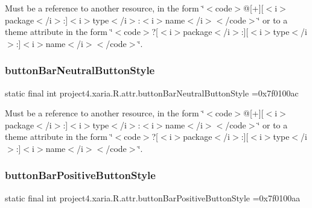 Must be a reference to another resource, in the form \char`\"{}$<$code$>$@\mbox{[}+\mbox{]}\mbox{[}$<$i$>$package$<$/i$>$\+:\mbox{]}$<$i$>$type$<$/i$>$\+:$<$i$>$name$<$/i$>$$<$/code$>$\char`\"{} or to a theme attribute in the form \char`\"{}$<$code$>$?\mbox{[}$<$i$>$package$<$/i$>$\+:\mbox{]}\mbox{[}$<$i$>$type$<$/i$>$\+:\mbox{]}$<$i$>$name$<$/i$>$$<$/code$>$\char`\"{}. \mbox{\label{classproject4_1_1xaria_1_1R_1_1attr_a8f089c80a964d4336181559f1fe82708}} 
\subsubsection{\texorpdfstring{button\+Bar\+Neutral\+Button\+Style}{buttonBarNeutralButtonStyle}}
{\footnotesize\ttfamily static final int project4.\+xaria.\+R.\+attr.\+button\+Bar\+Neutral\+Button\+Style =0x7f0100ac\hspace{0.3cm}{\ttfamily [static]}}

Must be a reference to another resource, in the form \char`\"{}$<$code$>$@\mbox{[}+\mbox{]}\mbox{[}$<$i$>$package$<$/i$>$\+:\mbox{]}$<$i$>$type$<$/i$>$\+:$<$i$>$name$<$/i$>$$<$/code$>$\char`\"{} or to a theme attribute in the form \char`\"{}$<$code$>$?\mbox{[}$<$i$>$package$<$/i$>$\+:\mbox{]}\mbox{[}$<$i$>$type$<$/i$>$\+:\mbox{]}$<$i$>$name$<$/i$>$$<$/code$>$\char`\"{}. \mbox{\label{classproject4_1_1xaria_1_1R_1_1attr_ab5e2bcb21e4e4d05f1b1da0ef2dd1099}} 
\subsubsection{\texorpdfstring{button\+Bar\+Positive\+Button\+Style}{buttonBarPositiveButtonStyle}}
{\footnotesize\ttfamily static final int project4.\+xaria.\+R.\+attr.\+button\+Bar\+Positive\+Button\+Style =0x7f0100aa\hspace{0.3cm}{\ttfamily [static]}}

